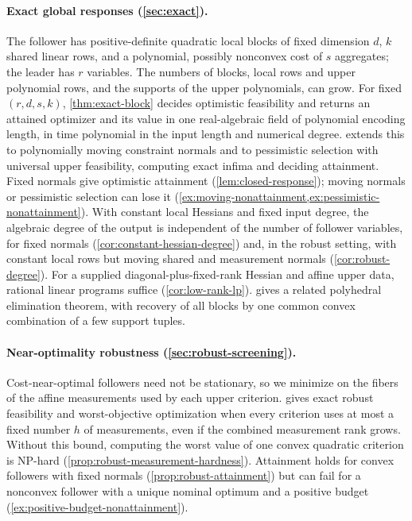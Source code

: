 \paragraph{Exact global responses (\cref{sec:exact}).}
The follower has positive-definite quadratic local blocks of fixed
dimension $d$, $k$ shared linear rows, and a polynomial, possibly nonconvex
cost of $s$ aggregates; the leader has $r$ variables. The numbers of
blocks, local rows and upper polynomial rows, and the supports of the upper
polynomials, can grow. For fixed $(r,d,s,k)$, \cref{thm:exact-block}
decides optimistic feasibility and returns an attained optimizer and its
value in one real-algebraic field of polynomial encoding length, in time
polynomial in the input length and numerical degree. 
extends this to polynomially moving constraint normals and to pessimistic
selection with universal upper feasibility, computing exact infima and
deciding attainment. Fixed normals give optimistic attainment
(\cref{lem:closed-response}); moving normals or pessimistic selection can
lose it (\cref{ex:moving-nonattainment,ex:pessimistic-nonattainment}).
With constant local Hessians and fixed input degree, the algebraic degree
of the output is independent of the number of follower variables, for
fixed normals (\cref{cor:constant-hessian-degree}) and, in the robust
setting, with constant local rows but moving shared and measurement normals
(\cref{cor:robust-degree}). For a
supplied diagonal-plus-fixed-rank Hessian and affine upper data, rational
linear programs suffice (\cref{cor:low-rank-lp}). 
gives a related polyhedral elimination theorem, with recovery of all blocks
by one common convex combination of a few support tuples.

\paragraph{Near-optimality robustness (\cref{sec:robust-screening}).}
Cost-near-optimal followers need not be stationary, so we minimize on the
fibers of the affine measurements used by each upper criterion.
 gives exact robust feasibility and
worst-objective optimization when every criterion uses at most a fixed
number $h$ of measurements, even if the combined measurement rank grows.
Without this bound, computing the worst value of one convex quadratic
criterion is NP-hard (\cref{prop:robust-measurement-hardness}). Attainment
holds for convex followers with fixed normals (\cref{prop:robust-attainment})
but can fail for a nonconvex follower with a unique nominal optimum and a
positive budget (\cref{ex:positive-budget-nonattainment}).

